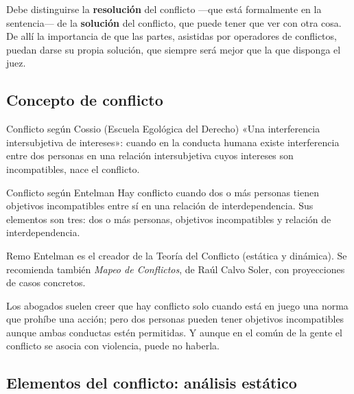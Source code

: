 \documentclass[12pt,oneside]{book}
\begin{document}
\begin{importante}
Debe distinguirse la \textbf{resolución} del conflicto ---que está formalmente en la sentencia--- de la \textbf{solución} del conflicto, que puede tener que ver con otra cosa. De allí la importancia de que las partes, asistidas por operadores de conflictos, puedan darse su propia solución, que siempre será mejor que la que disponga el juez.
\end{importante}

\subsection{Concepto de conflicto}

\begin{definicion}{Conflicto según Cossio (Escuela Egológica del Derecho)}
«Una interferencia intersubjetiva de intereses»: cuando en la conducta humana existe interferencia entre dos personas en una relación intersubjetiva cuyos intereses son incompatibles, nace el conflicto.
\end{definicion}

\begin{definicion}{Conflicto según Entelman}
Hay conflicto cuando dos o más personas tienen objetivos incompatibles entre sí en una relación de interdependencia. Sus elementos son tres: dos o más personas, objetivos incompatibles y relación de interdependencia.
\end{definicion}

Remo Entelman es el creador de la Teoría del Conflicto (estática y dinámica). Se recomienda también \textit{Mapeo de Conflictos}, de Raúl Calvo Soler, con proyecciones de casos concretos.

Los abogados suelen creer que hay conflicto solo cuando está en juego una norma que prohíbe una acción; pero dos personas pueden tener objetivos incompatibles aunque ambas conductas estén permitidas. Y aunque en el común de la gente el conflicto se asocia con violencia, puede no haberla.

\subsection{Elementos del conflicto: análisis estático}
\end{document}
